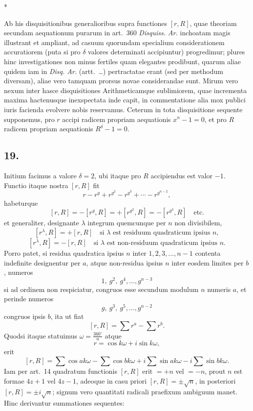 \documentclass[12pt]{article}
\begin{document}
\bigskip
\centerline{* \qquad * \qquad *}

Ab his disquisitionibus generalioribus supra functiones $[r,R]$, quae theoriam secundam aequationum purarum in art.~360 \emph{Disquiss. Ar.} inchoatam magis illustrant et ampliant, ad casuum quorundam specialium considerationem accuratiorem (puta si pro $\delta$ valores determinati accipiuntur) progredimur; plures hinc investigationes non minus fertiles quam elegantes prodibunt, quarum aliae quidem iam in \emph{Disq. Ar.} (artt.~\ldots) pertractatae erant (sed per methodum diversam), aliae vero tamquam prorsus novae considerandae sunt. Mirum vero nexum inter hasce disquisitiones Arithmeticamque sublimiorem, quae incrementa maxima hactenusque inexspectata inde capit, in commentatione alia mox publici iuris facienda evolvere nobis reservamus. Ceterum in tota disquisitione sequente supponemus, pro $r$ accipi radicem propriam aequationis $x^n-1=0$, et pro $R$ radicem propriam aequationis $R^\delta-1=0$.

\subsection*{19.}

Initium facimus a valore $\delta=2$, ubi itaque pro $R$ accipiendus est valor $-1$. Functio itaque nostra $[r,R]$ fit
\[
r-r^g+r^{g^2}-r^{g^3}+\cdots-r^{g^{n-2}},
\]
habeturque
\[
[r,R]=-[r^g,R]=+[r^{g^2},R]=-[r^{g^3},R]\quad\text{etc.}
\]
et generaliter, designante $\lambda$ integrum quemcunque per $n$ non divisibilem,
\[
[r^\lambda,R]=+[r,R]\quad \text{si }\lambda\text{ est residuum quadraticum ipsius }n,
\]
\[
[r^\lambda,R]=-[r,R]\quad \text{si }\lambda\text{ est non-residuum quadraticum ipsius }n.
\]
Porro patet, si residua quadratica ipsius $n$ inter $1,2,3,\ldots,n-1$ contenta indefinite designentur per $a$, atque non-residua ipsius $n$ inter eosdem limites per $b$, numeros
\[
1,\ g^2,\ g^4,\ldots,g^{n-3}
\]
si ad ordinem non respiciatur, congruos esse secundum modulum $n$ numeris $a$, et perinde numeros
\[
g,\ g^3,\ g^5,\ldots,g^{n-2}
\]
congruos ipsis $b$, ita ut fiat
\[
[r,R]=\sum r^a-\sum r^b.
\]
Quodsi itaque statuimus $\omega=\frac{360^\circ}{n}$ atque
\[
r=\cos k\omega+i\sin k\omega,
\]
erit
\[
[r,R]=\sum\cos ak\omega-\sum\cos bk\omega
+i\sum\sin ak\omega-i\sum\sin bk\omega.
\]
Iam per art.~14 quadratum functionis $[r,R]$ erit $=+n$ vel $=-n$, prout $n$ est formae $4z+1$ vel $4z-1$, adeoque in casu priori $[r,R]=\pm\sqrt n$, in posteriori $[r,R]=\pm i\sqrt n$; signum vero quantitati radicali praefixum ambiguum manet. Hinc derivantur summationes sequentes:
\end{document}
